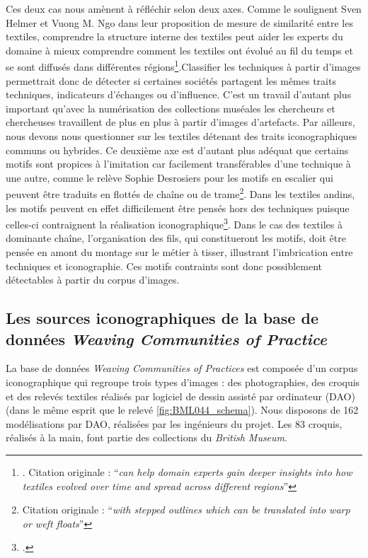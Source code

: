 Ces deux cas nous amènent à réfléchir selon deux axes. Comme le soulignent Sven Helmer et Vuong M. Ngo dans leur proposition de mesure de similarité entre les textiles, comprendre la structure interne des textiles \og peut aider les experts du domaine à mieux comprendre comment les textiles ont évolué au fil du temps et se sont diffusés dans différentes régions\footnote{\cite[p.~163]{helmerSimilarityMeasureWeaving2018}. Citation originale : \textquotedblleft \textit{can help domain experts gain deeper insights into how textiles evolved over time and spread across different regions}\textquotedblright}.\fg \:Classifier les techniques à partir d'images permettrait donc de détecter si certaines sociétés partagent les mêmes traits techniques, indicateurs d'échanges ou d'influence. C'est un travail d'autant plus important qu'avec la numérisation des collections muséales les chercheurs et chercheuses travaillent de plus en plus à partir d'images d'artefacts. Par ailleurs, nous devons nous questionner sur les textiles détenant des traits iconographiques communs ou hybrides. Ce deuxième axe est d'autant plus adéquat que certains motifs sont propices à l'imitation car facilement transférables d'une technique à une autre, comme le relève Sophie Desrosiers pour les motifs \og en escalier qui peuvent être traduits en flottés de chaîne ou de trame\fg \footnote{\cite[p.~7]{desrosiersRevisitingOcucajeOpened2008} Citation originale : \textquotedblleft \textit{with stepped outlines which can be translated into warp or weft floats}\textquotedblright}. Dans les textiles andins, les motifs peuvent en effet difficilement être pensés hors des techniques puisque celles-ci contraignent la réalisation iconographique\footcite[p.~118]{conklinStructureMeaningAndean1997}. Dans le cas des textiles à dominante chaîne, l'organisation des fils, qui constitueront les motifs, doit être pensée en amont du montage sur le métier à tisser, illustrant l'imbrication entre techniques et iconographie. Ces motifs contraints sont donc possiblement détectables à partir du corpus d'images.

\subsection{Les sources iconographiques de la base de données \textit{Weaving Communities of Practice}}

La base de données \textit{Weaving Communities of Practices} est composée d'un corpus iconographique qui regroupe trois types d'images : des photographies, des croquis et des relevés textiles réalisés par logiciel de dessin assisté par ordinateur (DAO) (dans le même esprit que le relevé \ref{fig:BML044_schema}). Nous disposons de 162 modélisations par DAO, réalisées par les ingénieurs du projet. Les 83 croquis, réalisés à la main, font partie des collections du \textit{British Museum}.

